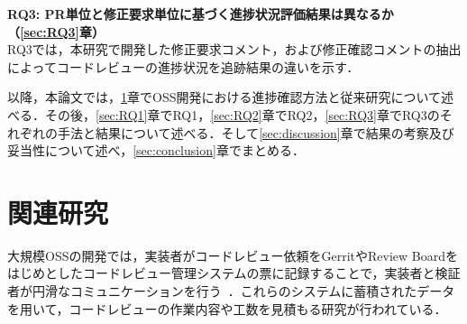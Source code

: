 \documentclass[T,J]{fose} %
\newcommand{\RQThree}{PR単位と修正要求単位に基づく進捗状況評価結果は異なるか}
\newcommand{\change}[1]{\colorbox{green}{{\bf CHANGE}:}{\color{blue} {\textbf{[#1]}}}}
\begin{document}
\noindent\textbf{RQ3: \RQThree（\ref{sec:RQ3}章）}\\
RQ3では，本研究で開発した修正要求コメント，および修正確認コメントの抽出によってコードレビューの進捗状況を追跡結果の違いを示す．


以降，本論文では，\ref{sec:progress}章でOSS開発における進捗確認方法と従来研究について述べる．その後，\ref{sec:RQ1}章でRQ1，\ref{sec:RQ2}章でRQ2，\ref{sec:RQ3}章でRQ3のそれぞれの手法と結果について述べる．そして\ref{sec:discussion}章で結果の考察及び妥当性について述べ，\ref{sec:conclusion}章でまとめる．



\section{関連研究}\label{sec:progress}

大規模OSSの開発では，実装者がコードレビュー依頼をGerritやReview Boardをはじめとしたコードレビュー管理システムの票に記録することで，実装者と検証者が円滑なコミュニケーションを行う~\cite{code_review}．これらのシステムに蓄積されたデータを用いて，コードレビューの作業内容や工数を見積もる研究が行われている．


\end{document}
